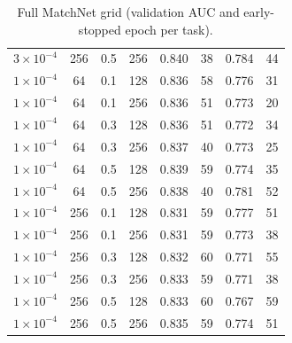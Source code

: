 \begin{table}[H]
\begin{tabularx}{\linewidth}{@{}c c c c r r r r@{}}
$3\times10^{-4}$ & 256 & 0.5 & 256 & 0.840 & 38 & 0.784 & 44\\
$1\times10^{-4}$ & 64 & 0.1 & 128 & 0.836 & 58 & 0.776 & 31\\
$1\times10^{-4}$ & 64 & 0.1 & 256 & 0.836 & 51 & 0.773 & 20\\
$1\times10^{-4}$ & 64 & 0.3 & 128 & 0.836 & 51 & 0.772 & 34\\
$1\times10^{-4}$ & 64 & 0.3 & 256 & 0.837 & 40 & 0.773 & 25\\
$1\times10^{-4}$ & 64 & 0.5 & 128 & 0.839 & 59 & 0.774 & 35\\
$1\times10^{-4}$ & 64 & 0.5 & 256 & 0.838 & 40 & 0.781 & 52\\
$1\times10^{-4}$ & 256 & 0.1 & 128 & 0.831 & 59 & 0.777 & 51\\
$1\times10^{-4}$ & 256 & 0.1 & 256 & 0.831 & 59 & 0.773 & 38\\
$1\times10^{-4}$ & 256 & 0.3 & 128 & 0.832 & 60 & 0.771 & 55\\
$1\times10^{-4}$ & 256 & 0.3 & 256 & 0.833 & 59 & 0.771 & 38\\
$1\times10^{-4}$ & 256 & 0.5 & 128 & 0.833 & 60 & 0.767 & 59\\
$1\times10^{-4}$ & 256 & 0.5 & 256 & 0.835 & 59 & 0.774 & 51\\
\bottomrule
\end{tabularx}
\caption{Full MatchNet grid (validation AUC and early-stopped epoch per task).}\label{tab:mnfull}
\end{table}
